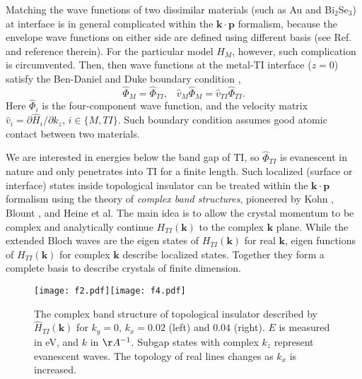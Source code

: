 \documentclass[11pt,revtex,aps]{report}
\def\v#1{\mathbf{#1}}
\begin{document}
Matching the wave functions of two dissimilar 
materials (such as Au and Bi$_2$Se$_3$) at interface is in general 
complicated within the $\mathbf{k\cdot p}$ formalism, because the envelope wave functions 
on either side are defined using different basis (see Ref. \cite{bc} and reference therein). 
For the particular model $H_M$, however, such complication
is circumvented. Then, then wave functions at the metal-TI interface ($z=0$) satisfy the Ben-Daniel 
and Duke boundary condition \cite{duke}, 
\[
\hat{\Phi}_M=\hat{\Phi}_{TI}, \;\;\; \hat{v}_M \hat{\Phi}_M = \hat{v}_{TI}\hat{\Phi}_{TI}.
\]
Here $\hat{\Phi}_i$ is the four-component wave function, and 
the velocity matrix $\hat{v}_{i}=\partial \hat{H}_i/\partial k_z$, $i\in \{M, TI\}$. 
Such boundary condition assumes good atomic contact between two materials.

We are interested in energies below the band gap of TI, so 
$\hat{\Phi}_{TI}$ is evanescent in nature and only penetrates into TI 
for a finite length. Such localized (surface or interface) 
states inside topological insulator can be treated within the $\mathbf{k\cdot p}$ formalism 
using the theory of {\it complex band structures}, pioneered by Kohn \cite{kohn59}, Blount \cite{blount62}, 
and Heine \cite{heine63} et al. 
The main idea is to allow the crystal momentum to be complex and analytically continue
$H_{TI}(\v{k})$ to the complex $\v{k}$ plane. 
While the extended Bloch waves are the eigen states of $H_{TI}(\v{k})$ for real $\v{k}$, 
eigen functions of $H_{TI}(\v{k})$ for complex $\v{k}$ describe localized states. Together they
form a complete basis to describe crystals of finite dimension. 

\begin{figure}
\center
\texttt{[image: f2.pdf]}\texttt{[image: f4.pdf]}
\caption{The complex band structure
of topological insulator described by $\hat{H}_{TI}(\v{k})$ 
for $k_y=0$, $k_x=0.02$ (left) and $0.04$ (right). $E$ is measured in eV, and $k$ in $\AA^{-1}$.
Subgap states with complex $k_z$ represent evanescent waves. 
The topology of  real lines \cite{heine63}  changes as $k_x$ is increased.  
}
\end{figure}
\end{document}
